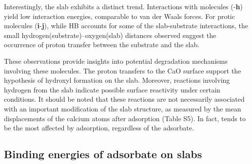 \documentclass[%
aip,
amsmath,amssymb,
preprint,%
jcp,
showkeys,
]{revtex4-2}
\begin{document}
Interestingly, the  slab exhibits a distinct trend. Interactions with  molecules (\textbf{}-\textbf{h}) yield low interaction energies, comparable to van der Waals forces. For protic molecules (\textbf{i}-\textbf{j}), while HB accounts for some of the slab-substrate interactions, the small hydrogen(substrate)--oxygen(slab) distances observed suggest the occurrence of proton transfer between the substrate and the slab.

These observations provide insights into potential degradation mechanisms involving these molecules. The proton transfers to the CaO surface support the hypothesis of hydroxyl formation on the slab. Moreover, reactions involving hydrogen from the  slab indicate possible surface reactivity under certain conditions.  It should be noted that these reactions are not necessarily associated with an important modification of the slab structure, as measured by the mean displacements of the calcium atoms after adsorption (Table S5). In fact,  tends to be the most affected by adsorption, regardless of the adsorbate.

\subsection{Binding energies of adsorbate on slabs}\label{sec:BE's}

\newcommand{\XPSsa}[2]{
	\begin{figure}[!h]
		\centering
		\texttt{[image: Figure\#1]}
		\caption{Difference (dotted line) between the XPS spectra before (dashed line) and after (solid line) adsorption for compounds \textbf{#2} on various substrates, as computed using the \cpx{E_\infty} protocol. Letters indicate mean binding energies for bulk (``b"), surface (``s", with $\star$ marking the atom closest to the adsorbate), surface hydroxides (``h"), and different atoms of the adsorbate.}
		\label{fig:spectraXPSads#2}
	\end{figure}
}

\newcommand{\XPSsab}[4]{
	\begin{figure}[p]
		\centering
		\texttt{[image: Figure\#1]}
		\texttt{[image: Figure\#2]}
		\caption{Difference (dotted line) between the XPS spectra before (dashed line) and after (solid line) adsorption for compounds \textbf{#3} (panel a) and \textbf{#4} (panel b) on various substrates, as computed using the \cpx{E_\infty} protocol. Letters indicate mean binding energies for bulk (``b"), surface (``s", with $\star$ marking the atom closest to the adsorbate), surface hydroxides (``h"), and different atoms of the adsorbate.}
		\label{fig:spectraXPSads#3#4}
	\end{figure}
}
\end{document}
